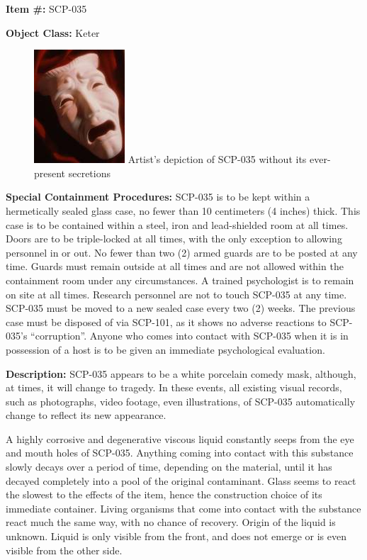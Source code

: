 
\textbf{Item \#:} SCP-035

\textbf{Object Class:} Keter

\begin{figure}[h]
\begin{center}
\includegraphics[scale=1.3]{scp/035.jpg}
\linebreak Artist's depiction of SCP-035 without its ever-present secretions
\end{center}
\end{figure}

\textbf{Special Containment Procedures:} SCP-035 is to be kept within a hermetically sealed glass case, no fewer than 10 centimeters (4 inches) thick. This case is to be contained within a steel, iron and lead-shielded room at all times. Doors are to be triple-locked at all times, with the only exception to allowing personnel in or out. No fewer than two (2) armed guards are to be posted at any time. Guards must remain outside at all times and are not allowed within the containment room under any circumstances. A trained psychologist is to remain on site at all times. Research personnel are not to touch SCP-035 at any time. SCP-035 must be moved to a new sealed case every two (2) weeks. The previous case must be disposed of via SCP-101, as it shows no adverse reactions to SCP-035's “corruption”. Anyone who comes into contact with SCP-035 when it is in possession of a host is to be given an immediate psychological evaluation.

\textbf{Description:} SCP-035 appears to be a white porcelain comedy mask, although, at times, it will change to tragedy. In these events, all existing visual records, such as photographs, video footage, even illustrations, of SCP-035 automatically change to reflect its new appearance.

A highly corrosive and degenerative viscous liquid constantly seeps from the eye and mouth holes of SCP-035. Anything coming into contact with this substance slowly decays over a period of time, depending on the material, until it has decayed completely into a pool of the original contaminant. Glass seems to react the slowest to the effects of the item, hence the construction choice of its immediate container. Living organisms that come into contact with the substance react much the same way, with no chance of recovery. Origin of the liquid is unknown. Liquid is only visible from the front, and does not emerge or is even visible from the other side.

